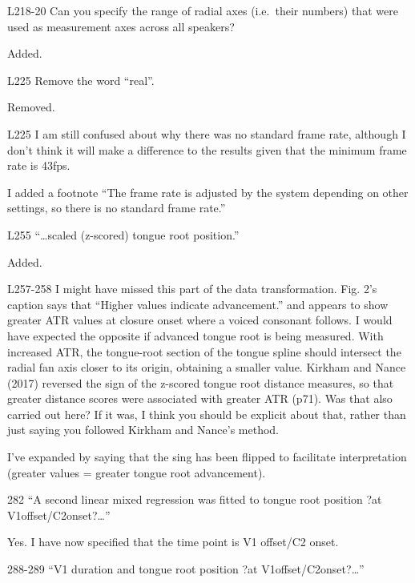 \documentclass[]{article}
\begin{document}
L218-20 Can you specify the range of radial axes (i.e.~their numbers)
that were used as measurement axes across all speakers?

\color{plum}

Added. \color{black}

L225 Remove the word ``real''.

\color{plum}

Removed. \color{black}

L225 I am still confused about why there was no standard frame rate,
although I don't think it will make a difference to the results given
that the minimum frame rate is 43fps.

\color{plum}

I added a footnote ``The frame rate is adjusted by the system depending
on other settings, so there is no standard frame rate.'' \color{black}

L255 ``\ldots{}scaled (z-scored) tongue root position.''

\color{plum}

Added. \color{black}

L257-258 I might have missed this part of the data transformation. Fig.
2's caption says that ``Higher values indicate advancement.'' and
appears to show greater ATR values at closure onset where a voiced
consonant follows. I would have expected the opposite if advanced tongue
root is being measured. With increased ATR, the tongue-root section of
the tongue spline should intersect the radial fan axis closer to its
origin, obtaining a smaller value. Kirkham and Nance (2017) reversed the
sign of the z-scored tongue root distance measures, so that greater
distance scores were associated with greater ATR (p71). Was that also
carried out here? If it was, I think you should be explicit about that,
rather than just saying you followed Kirkham and Nance's method.

\color{plum}

I've expanded by saying that the sing has been flipped to facilitate
interpretation (greater values = greater tongue root advancement).
\color{black}

282 ``A second linear mixed regression was fitted to tongue root
position ?at V1offset/C2onset?\ldots{}''

\color{plum}

Yes. I have now specified that the time point is V1 offset/C2 onset.
\color{black}

288-289 ``V1 duration and tongue root position ?at
V1offset/C2onset?\ldots{}''
\end{document}

